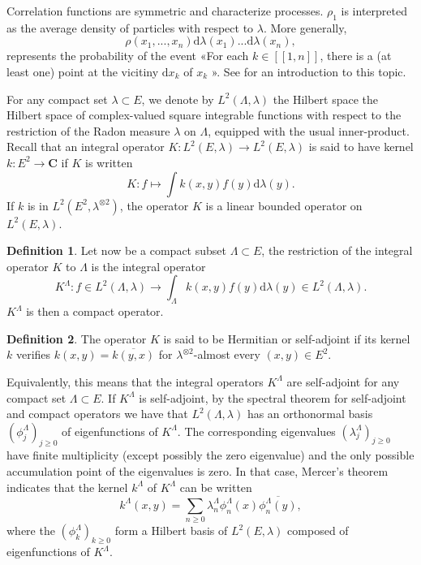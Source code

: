 \documentclass[11pt]{article}
\newcommand{\og}{«\:}
\newcommand{\fg}{»}
\theoremstyle{plain}
\theoremstyle{definition}
\newtheorem{definition}{Definition}
\begin{document}
Correlation functions are symmetric and characterize processes. $\rho_1$ is interpreted as the average density of particles with respect to $\lambda$. More generally,
\[
    \rho (x_1, ..., x_n) \mathrm d \lambda (x_1) ... \mathrm d \lambda (x_n),
\]
represents the probability of the event \og For each $ k \in [ \! [1, n] \! ] $, there is a (at least one) point at the
vicitiny $ \mathrm d x_k $ of $ x_k $ \fg. See \cite{PPIntro2003} for an introduction to this topic.

For any compact set $ \lambda \subset E $, we denote by $ L^2(\Lambda, \lambda) $ the Hilbert space the Hilbert space of complex-valued square integrable functions with respect to the restriction of the Radon measure $ \lambda $ on $\Lambda $, equipped with the usual inner-product. Recall that an integral operator $ K : L^2(E, \lambda) \to L^2(E, \lambda)$ is said to have kernel $ k : E^2 \to \mathbf C $ if $K$ is written
\[
    K : f \mapsto  \int k(x, y) f(y) \mathrm d\lambda(y).
\]
If $k$ is in $L^2(E^2, \lambda^{\otimes 2})$, the operator $K$ is a linear bounded operator on $L^2(E, \lambda)$.

\begin{definition} 
    Let now be a compact subset $ \Lambda \subset E $, the restriction of the integral operator $K$ to $\Lambda $ is the integral operator
    \[
        K^\Lambda : f \in L^2(\Lambda, \lambda) \to \int_\Lambda k(x,y) f(y) \mathrm d \lambda (y) \in L^2(\Lambda, \lambda).
    \]
    $ K^\Lambda $ is then a compact operator.
\end{definition}

\begin{definition} 
    The operator $K$ is said to be Hermitian or self-adjoint if its kernel $k$ verifies $ k(x, y) = \overline{k(y, x)}$ for $\lambda^{\otimes 2}$-almost every $(x, y) \in E^2$.
\end{definition}

Equivalently, this means that the integral operators $K^\Lambda$ are self-adjoint for any compact set $\Lambda \subset E$. If $K^\Lambda$ is self-adjoint, by the spectral theorem for self-adjoint and compact operators we have that $L^2(\Lambda, \lambda)$ has an orthonormal basis $(\phi_j^\Lambda)_{j \ge 0}$ of eigenfunctions of $K^\Lambda$. The corresponding eigenvalues $(\lambda_j^\Lambda)_{j\geqslant 0}$ have finite multiplicity (except possibly the zero eigenvalue) and the only possible accumulation point of the eigenvalues is zero. In that case, Mercer's theorem indicates that the kernel $k^\Lambda$ of $K^\Lambda$ can be written
\[ 
    k^\Lambda(x, y) = \sum_{n \geqslant 0} \lambda_n^\Lambda \phi_n^\Lambda(x) \overline{\phi_n^\Lambda(y)},
\]
where the $(\phi_k^\Lambda)_{k \ge 0}$ form a Hilbert basis of $L^2(E, \lambda)$ composed of eigenfunctions of $K^\Lambda$.
\end{document}
